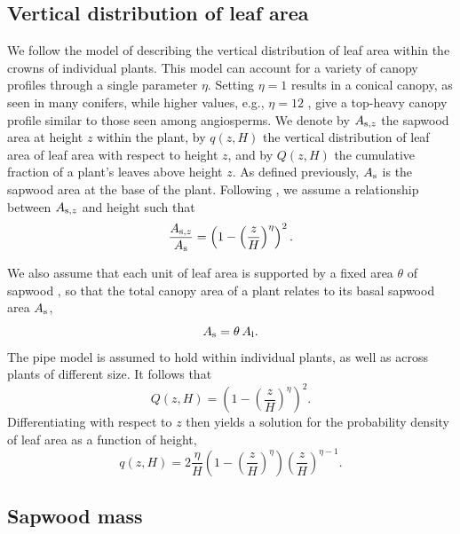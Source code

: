 \documentclass[10pt,twoside]{article}
\begin{document}
\subsection{Vertical distribution of leaf
area}\label{vertical-distribution-of-leaf-area}

We follow the model of \citet{Yokozawa-1995} describing the vertical
distribution of leaf area within the crowns of individual plants. This
model can account for a variety of canopy profiles through a single
parameter \(\eta\). Setting \(\eta = 1\) results in a conical canopy, as
seen in many conifers, while higher values, e.g., \(\eta = 12\) , give a
top-heavy canopy profile similar to those seen among angiosperms. We denote
by \(A_{{\rm s},z}\) the sapwood area at height \(z\) within the plant, by \(q(z, H)\) the vertical distribution of leaf area of
leaf area with respect to height \(z\), and by \(Q(z, H)\) the cumulative fraction of a
plant's leaves above height \(z\). As defined previously, \(A_{\rm s}\) is the sapwood
area at the base of the plant. Following \citet{Yokozawa-1995}, we
assume a relationship between \(A_{{\rm s},z}\) and height such that
\begin{equation}\label{eq:crown1}
\frac{A_{{\rm s},z}}{A_{\rm s}} = \left(1 - \left(\frac{z}{H}\right)^\eta\right)^2.
\end{equation}

We also assume that each unit of leaf area is supported by a fixed area \(\theta\) of
sapwood \citep[in agreement with the pipe model;][]{Shinozaki-1964}, so that the total canopy
area of a plant relates to its basal sapwood area \(A_{\rm s}\),
\begin{equation}\label{eq:crown2}
A_{\rm s} = \theta \, A_{\rm l}.
\end{equation}
The pipe model is assumed to hold within individual plants, as well as
across plants of different size. It follows that
\begin{equation}\label{eq:crown1}
Q(z, H) = \left(1-\left(\frac{z}{H}\right)^\eta\right)^2.
\end{equation}
Differentiating with respect to \(z\) then yields a solution for the
probability density of leaf area as a function of height,
\begin{equation}\label{eq:crown3}
q(z, H) = 2\frac{\eta}{H}\left(1-\left(\frac{z}{H}\right)^{\eta}\right) \left(\frac{z}{H}\right)^{\eta-1}.
\end{equation}

\subsection{Sapwood mass}\label{mass-of-sapwood}
\end{document}

